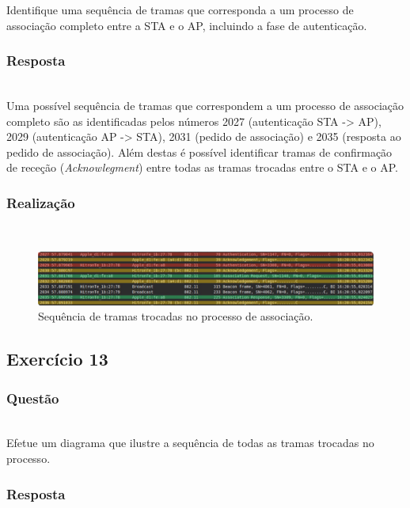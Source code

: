 \documentclass{llncs}
\begin{document}
Identifique uma sequência de tramas que corresponda a um processo de associação completo entre a STA e o AP, incluindo a fase de autenticação.

\subsubsection{Resposta}\rule[-10pt]{0pt}{10pt}\\

Uma possível sequência de tramas que correspondem a um processo de associação completo são as identificadas pelos números 2027 (autenticação STA -> AP), 2029 (autenticação AP -> STA), 2031 (pedido de associação) e 2035 (resposta ao pedido de associação). Além destas é possível identificar tramas de confirmação de receção (\textit{Acknowlegment}) entre todas as tramas trocadas entre o STA e o AP.

\subsubsection{Realização}\rule[-10pt]{0pt}{10pt}\\

\begin{figure}
  \begin{center}
  \includegraphics[scale=0.35]{./imagens/assoc_seq.png} 
  \end{center}
  \caption{Sequência de tramas trocadas no processo de associação.}
  \label{fig:assoc_seq}
\end{figure}


\clearpage
\subsection{Exercício 13}
\subsubsection{Questão}\rule[-10pt]{0pt}{10pt}\\

Efetue um diagrama que ilustre a sequência de todas as tramas trocadas no processo.

\subsubsection{Resposta}\rule[-10pt]{0pt}{10pt}\\
\end{document}
